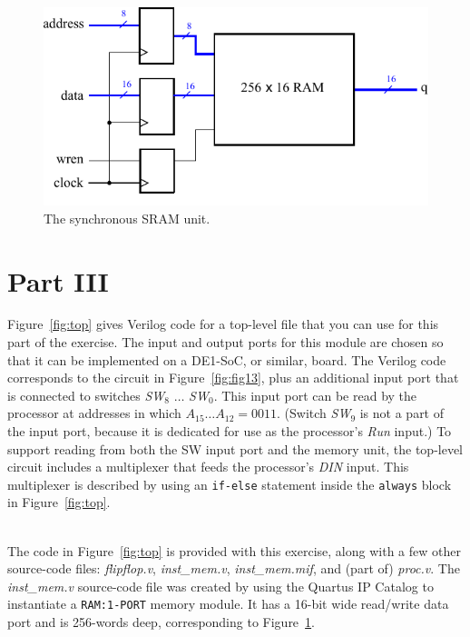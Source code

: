 \documentclass[epsfig,10pt,fullpage]{article} \addtolength{\textwidth}{1.5in}
\begin{document}
\begin{figure}[b]
\begin{center}
\includegraphics{figures/figure14.pdf}
\end{center}
\vspace{-0.5cm}
\caption{The synchronous SRAM unit.}
\label{fig:fig14}
\end{figure}

\section*{Part III}

Figure~\ref{fig:top} gives Verilog code for a top-level file that you can use for this
part of the exercise. The input and output ports for this module are chosen so that it can
be implemented on a DE1-SoC, or similar, board. The Verilog code corresponds to the circuit 
in Figure~\ref{fig:fig13},
plus an additional input port that is connected to switches {\it SW}$_8$ $\ldots$ {\it SW}$_0$.
This input port can be read by the processor at addresses in which $A_{15} \ldots A_{12} = 0011$.
(Switch {\it SW}$_9$ is not a part of the input port, because it is dedicated for use as the
processor's {\it Run} input.) To support reading from both the SW input port and the memory
unit, the top-level circuit includes a multiplexer that feeds the processor's {\it DIN}
input. This multiplexer is described by using an \texttt{if-else} statement inside 
the \texttt{always} block in Figure~\ref{fig:top}.

~\\
\noindent
The code in Figure~\ref{fig:top} is provided with this exercise, along with a few
other source-code files: {\it flipflop.v}, {\it inst\_mem.v}, {\it inst\_mem.mif}, and 
(part of) {\it proc.v}. The {\it inst\_mem.v} source-code file was created by using the Quartus IP 
Catalog to instantiate a \texttt{RAM:1-PORT} memory module. It has a 16-bit wide read/write
data port and is 256-words deep, corresponding to Figure~\ref{fig:fig14}.
\end{document}
